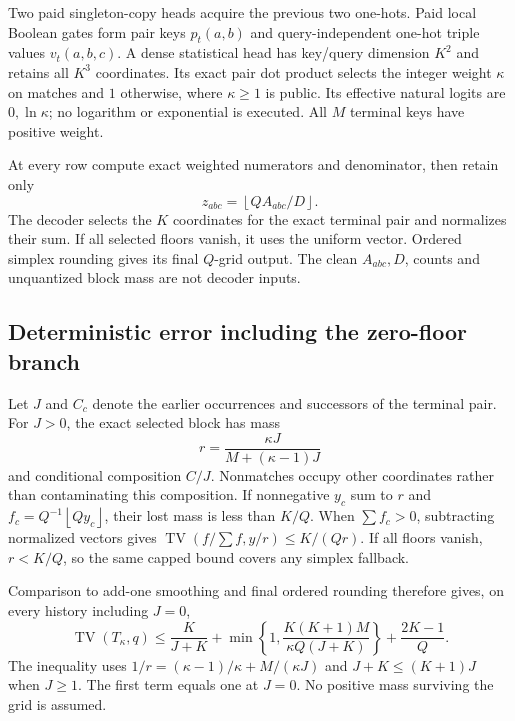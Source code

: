 \documentclass[11pt,letterpaper]{article}
\theoremstyle{definition}\newtheorem{definition}[theorem]{Definition}
\theoremstyle{remark}\newtheorem{remark}[theorem]{Remark}
\newcommand{\TV}{\operatorname{TV}}
\newcommand{\floor}[1]{\left\lfloor #1\right\rfloor}
\begin{document}
Two paid singleton-copy heads acquire the previous two one-hots. Paid local Boolean gates form pair keys $p_t(a,b)$ and query-independent one-hot triple values $v_t(a,b,c)$. A dense statistical head has key/query dimension $K^2$ and retains all $K^3$ coordinates. Its exact pair dot product selects the integer weight $\kappa$ on matches and $1$ otherwise, where $\kappa\ge1$ is public. Its effective natural logits are $0,\ln\kappa$; no logarithm or exponential is executed. All $M$ terminal keys have positive weight.

At every row compute exact weighted numerators and denominator, then retain only
\[
 z_{abc}=\floor{Q A_{abc}/D}.
\]
The decoder selects the $K$ coordinates for the exact terminal pair and normalizes their sum. If all selected floors vanish, it uses the uniform vector. Ordered simplex rounding gives its final $Q$-grid output. The clean $A_{abc},D$, counts and unquantized block mass are not decoder inputs.

\subsection{Deterministic error including the zero-floor branch}
Let $J$ and $C_c$ denote the earlier occurrences and successors of the terminal pair. For $J>0$, the exact selected block has mass
\begin{equation}\label{eq:blockmass}
 r=\frac{\kappa J}{M+(\kappa-1)J}
\end{equation}
and conditional composition $C/J$. Nonmatches occupy other coordinates rather than contaminating this composition. If nonnegative $y_c$ sum to $r$ and $f_c=Q^{-1}\floor{Qy_c}$, their lost mass is less than $K/Q$. When $\sum f_c>0$, subtracting normalized vectors gives $\TV(f/\sum f,y/r)\le K/(Qr)$. If all floors vanish, $r<K/Q$, so the same capped bound covers any simplex fallback.

Comparison to add-one smoothing and final ordered rounding therefore gives, on every history including $J=0$,
\begin{equation}\label{eq:inventoryerr}
 \TV(T_\kappa,q)\le\frac K{J+K}+
 \min\left\{1,\frac{K(K+1)M}{\kappa Q(J+K)}\right\}
 +\frac{2K-1}{Q}.
\end{equation}
The inequality uses $1/r=(\kappa-1)/\kappa+M/(\kappa J)$ and $J+K\le(K+1)J$ when $J\ge1$. The first term equals one at $J=0$. No positive mass surviving the grid is assumed.
\end{document}
